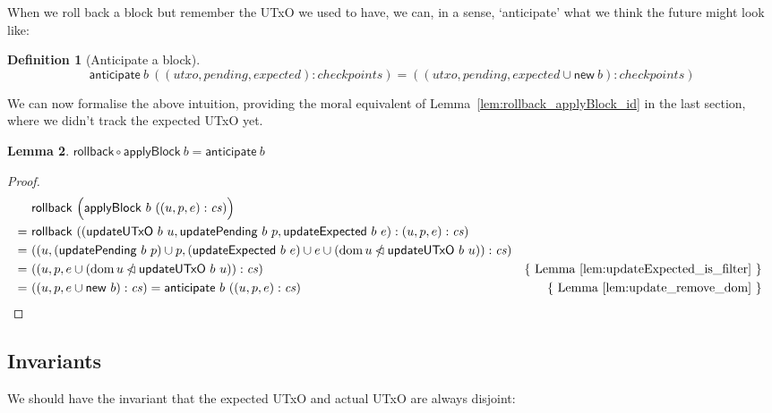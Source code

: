 \documentclass{article}
\newcommand{\restrictdom}{\lhd}
\newcommand{\subtractdom}{\mathbin{\slashed{\restrictdom}}}
\DeclareMathOperator{\dom}{dom}
\newtheorem{lemma}{Lemma}[section] %
\newtheorem{definition}[lemma]{Definition}
\numberwithin{equation}{lemma}
\begin{document}
When we roll back a block but remember the UTxO we used to have, we
can, in a sense, `anticipate' what we think the future might look like:

\begin{definition}[Anticipate a block]
\begin{equation*}
  \mathsf{anticipate} ~ b ~ ((\mathit{utxo}, \mathit{pending}, \mathit{expected}) : \mathit{checkpoints})
= ((\mathit{utxo}, \mathit{pending}, \mathit{expected} \cup \mathsf{new} ~ b) : \mathit{checkpoints})
\end{equation*}
\end{definition}

We can now formalise the above intuition, providing the moral equivalent
of Lemma~\ref{lem:rollback_applyBlock_id} in the last section, where we didn't
track the expected UTxO yet.

\begin{lemma}
\begin{math}
  \mathsf{rollback} \circ \mathsf{applyBlock} ~ b = \mathsf{anticipate} ~ b
\end{math}
\end{lemma}

\begin{proof}
\begin{align*}
  & ~ \mathsf{rollback} ~ \Bigl( \mathsf{applyBlock} ~ b ~ ((u, p, e) : \mathit{cs}) \Bigr) \\
= & ~ \mathsf{rollback} ~ ((\mathsf{updateUTxO} ~ b ~ u, \mathsf{updatePending} ~ b ~ p, \mathsf{updateExpected} ~ b ~ e) : (u, p, e) : \mathit{cs}) \\
= & ~ ((u, (\mathsf{updatePending} ~ b ~ p) \cup p,  (\mathsf{updateExpected} ~ b ~ e) \cup e \cup (\dom u \subtractdom \mathsf{updateUTxO} ~ b ~ u)) : \mathit{cs}) \\
= & ~ ((u, p, e \cup (\dom u \subtractdom \mathsf{updateUTxO} ~ b ~ u)) : \mathit{cs}) & \text{\{ Lemma~\ref{lem:updateExpected_is_filter} \} } \\
= & ~ ((u, p, e \cup \mathsf{new} ~ b) : \mathit{cs}) = \mathsf{anticipate} ~ b ~ ((u, p, e) : \mathit{cs}) & \text{\{ Lemma~\ref{lem:update_remove_dom} \} }
\end{align*}
\end{proof}

\subsection{Invariants}

We should have the invariant that the expected UTxO and actual UTxO are always
disjoint:
\end{document}
